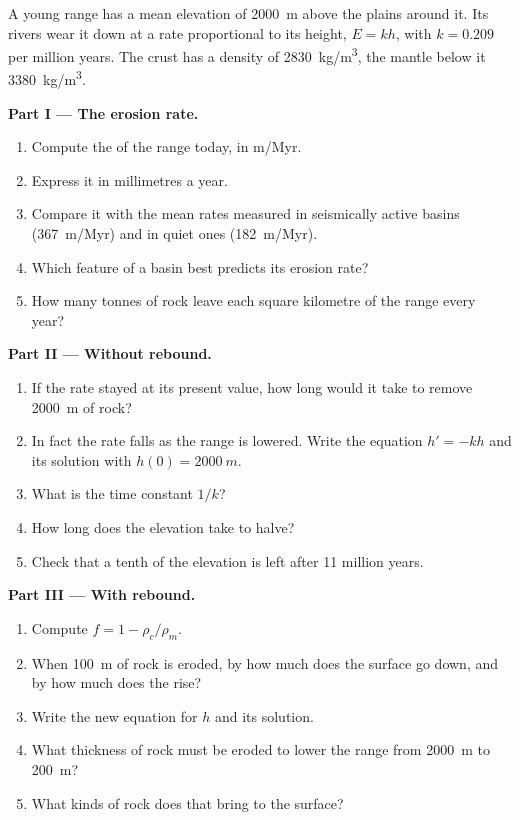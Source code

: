 \begin{problem}
\label{pb:g12:destruction-of-mountains:1}
A young range has a mean elevation of \qty{2000}{m} above the plains around
it. Its rivers wear it down at a rate proportional to its height, $E = kh$,
with $k = 0.209$ per million years. The crust has a density of
\qty{2830}{kg/m^3}, the mantle below it \qty{3380}{kg/m^3}.

\medskip
\noindent\textbf{Part I --- The erosion rate.}
\begin{enumerate}
  \item Compute the  of the range today, in \unit{m/Myr}.
  \item Express it in millimetres a year.
  \item Compare it with the mean rates measured in seismically active basins
        (\qty{367}{m/Myr}) and in quiet ones (\qty{182}{m/Myr}).
  \item Which feature of a basin best predicts its erosion rate?
  \item How many tonnes of rock leave each square kilometre of the range
        every year?
\end{enumerate}

\medskip
\noindent\textbf{Part II --- Without rebound.}
\begin{enumerate}[resume]
  \item If the rate stayed at its present value, how long would it take to
        remove \qty{2000}{m} of rock?
  \item In fact the rate falls as the range is lowered. Write the equation
        $h' = -kh$ and its solution with $h(0) = \qty{2000}{m}$.
  \item What is the time constant $1/k$?
  \item How long does the elevation take to halve?
  \item Check that a tenth of the elevation is left after 11 million years.
\end{enumerate}

\medskip
\noindent\textbf{Part III --- With rebound.}
\begin{enumerate}[resume]
  \item Compute $f = 1 - \rho_c/\rho_m$.
  \item When \qty{100}{m} of rock is eroded, by how much does the surface go
        down, and by how much does the  rise?
  \item Write the new equation for $h$ and its solution.
  \item What thickness of rock must be eroded to lower the range from
        \qty{2000}{m} to \qty{200}{m}?
  \item What kinds of rock does that bring to the surface?
\end{enumerate}


\end{problem}
